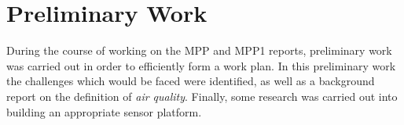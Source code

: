 \section{Preliminary Work}\label{preliminary}


During the course of working on the MPP and MPP1 reports, preliminary work was carried out in order to efficiently form a work plan. In this preliminary work the challenges which would be faced were identified, as well as a background report on the definition of \emph{air quality}. Finally, some research was carried out into building an appropriate sensor platform.








